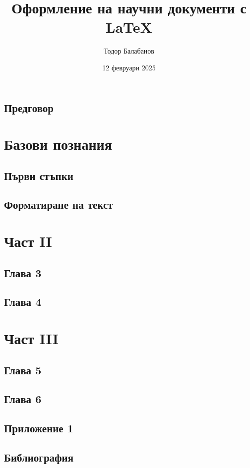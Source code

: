 \documentclass{book}
\title{Оформление на научни документи с LaTeX}
\author{Тодор Балабанов}
\date{12 февруари 2025}
\begin{document}
\pagestyle{empty}
\maketitle

\frontmatter

\tableofcontents
\listoffigures
\lstlistoflistings

\mainmatter

\pagestyle{myheadings}

\chapter*{Предговор}


\part{Базови познания}

\chapter{Първи стъпки}


\chapter{Форматиране на текст}


\part{Част II}

\chapter{Глава 3}

\chapter{Глава 4}

\part{Част III}

\chapter{Глава 5}

\chapter{Глава 6}

\appendix

\chapter{Приложение 1}

\backmatter

\chapter{Библиография}

\end{document}
